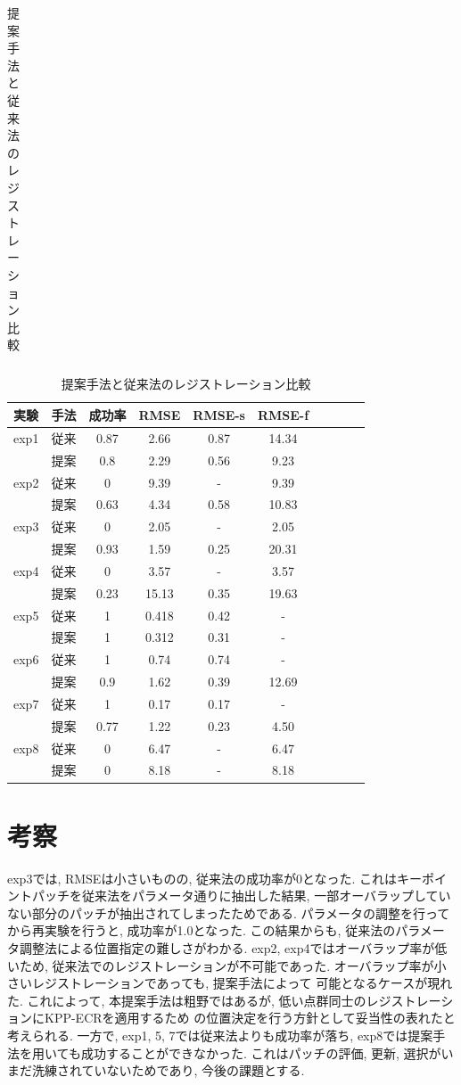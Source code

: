 \documentclass[twocolumn, 9pt, a4j, dvipdfmx]{jsarticle}
\begin{document}
\begin{table}[hbt]
\begin{center}
\begin{tabular}{c ccc}
    \end{tabular}
    \end{center}
    \footnotesize 
    \caption{提案手法と従来法のレジストレーション比較\label{Dynamic-result}}
    \begin{center}
    \begin{tabular}{l  c  c  c  c  c c c c c}\hline
実験 &  手法 & 成功率 &  RMSE & RMSE-s & RMSE-f \\ 
\hline \hline
    exp1 & 従来 & 0.87   & 2.66  & 0.87 & 14.34 \\
         & 提案 & 0.8    & 2.29  & 0.56 & 9.23 \\
    \hline
    exp2 & 従来 &   0    & 9.39  & -    & 9.39 \\
         & 提案 & 0.63   & 4.34  & 0.58 & 10.83\\
    \hline
    exp3 & 従来 &   0    & 2.05  & -    & 2.05 \\
         & 提案 & 0.93   & 1.59  & 0.25 & 20.31\\
    \hline
    exp4 & 従来 &   0    & 3.57  & -    & 3.57 \\
         & 提案 & 0.23   & 15.13 & 0.35 & 19.63\\
    \hline
    exp5 & 従来 &   1    & 0.418 & 0.42 & -    \\
         & 提案 &   1    & 0.312 & 0.31 & -    \\
    \hline
    exp6 & 従来 &   1    & 0.74  & 0.74  & -    \\
         & 提案 & 0.9    & 1.62  & 0.39  & 12.69\\
    \hline
    exp7 & 従来 &   1    & 0.17  & 0.17 &  -     \\
         & 提案 & 0.77   & 1.22  & 0.23 &  4.50 \\
    \hline
    exp8 & 従来 &   0    & 6.47  & -    &  6.47 \\
         & 提案 &   0    & 8.18  & -    &  8.18 \\
    \hline
    \end{tabular}
    \end{center} 
\end{table}      

\section{考察}
exp3では, RMSEは小さいものの, 従来法の成功率が0となった. 
これはキーポイントパッチを従来法をパラメータ通りに抽出した結果, 
一部オーバラップしていない部分のパッチが抽出されてしまったためである.  
パラメータの調整を行ってから再実験を行うと, 成功率が1.0となった. 
この結果からも, 従来法のパラメータ調整法による位置指定の難しさがわかる. 
exp2, exp4ではオーバラップ率が低いため, 
従来法でのレジストレーションが不可能であった.
オーバラップ率が小さいレジストレーションであっても, 提案手法によって
可能となるケースが現れた. 
これによって, 本提案手法は粗野ではあるが, 
低い点群同士のレジストレーションにKPP-ECRを適用するため
の位置決定を行う方針として妥当性の表れたと考えられる. 
一方で, exp1, 5, 7では従来法よりも成功率が落ち, 
exp8では提案手法を用いても成功することができなかった. 
これはパッチの評価, 更新, 選択がいまだ洗練されていないためであり, 
今後の課題とする. 
\end{document}

